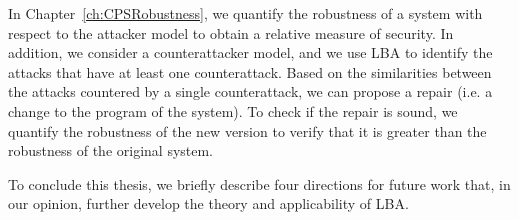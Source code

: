 In Chapter~\ref{ch:CPSRobustness}, we quantify the robustness of a system with respect to the attacker model to obtain a relative measure of security. In addition, we consider a counterattacker model, and we use LBA to identify the attacks that have at least one counterattack. Based on the similarities between the attacks countered by a single counterattack, we can propose a repair (i.e. a change to the program of the system). To check if the repair is sound, we quantify the robustness of the new version to verify that it is greater than the robustness of the original system.

To conclude this thesis, we briefly describe four directions for future work that, in our opinion, further develop the theory and applicability of LBA.




     
